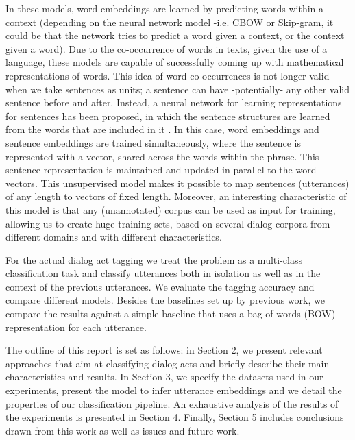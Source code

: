 In these models, word embeddings are learned by predicting words within a context (depending on the neural network model -i.e. CBOW or Skip-gram, it could be that the network tries to predict a word given a context, or the context given a word). Due to the co-occurrence of words in texts, given the use of a language, these models are capable of successfully coming up with mathematical representations of words. This idea of word co-occurrences is not longer valid when we take sentences as units; a sentence can have -potentially- any other valid sentence before and after. Instead, a neural network for learning representations for sentences has been proposed, in which the sentence structures are learned from the words that are included in it \cite{le2014distributed}. In this case, word embeddings and sentence embeddings are trained simultaneously, where the sentence is represented with a vector, shared across the words within the phrase. This sentence representation is maintained and updated in parallel to the word vectors.  This unsupervised model makes it possible to map sentences (utterances) of any length to vectors of fixed length. Moreover, an interesting characteristic of this model is that any (unannotated) corpus can be used as input for training, allowing us to create huge training sets, based on several dialog corpora from different domains and with different characteristics.

For the actual dialog act tagging we treat the problem as a multi-class classification task and classify utterances both in isolation as well as in the context of the previous utterances. We evaluate the tagging accuracy and compare different models. Besides the baselines set up by previous work, we compare the results against a simple baseline that uses a bag-of-words (BOW) representation for each utterance. 


The outline of this report is set as follows: in Section 2, we present relevant approaches that aim at classifying dialog acts and briefly describe their main characteristics and results. In Section 3, we specify the datasets used in our experiments, present the model to infer utterance embeddings and we detail the properties of our classification pipeline. An exhaustive analysis of the results of the experiments is presented in Section 4. Finally, Section 5 includes conclusions drawn from this work as well as issues and future work. 